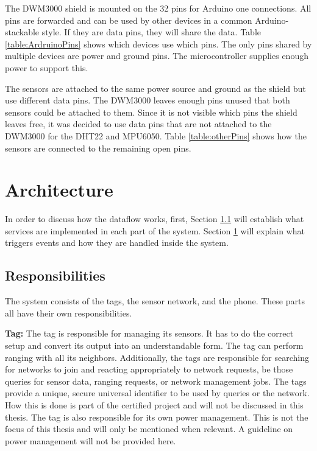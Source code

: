 The DWM3000 shield is mounted on the 32 pins for Arduino one connections. 
All pins are forwarded and can be used by other devices in a common Arduino-stackable style.
If they are data pins, they will share the data.
Table \ref{table:ArdruinoPins} shows which devices use which pins.
The only pins shared by multiple devices are power and ground pins.
The microcontroller supplies enough power to support this.

The sensors are attached to the same power source and ground as the shield but use different data pins.
The DWM3000 leaves enough pins unused that both sensors could be attached to them.
Since it is not visible which pins the shield leaves free, it was decided to use data pins that are not attached to the DWM3000 for the DHT22 and MPU6050.
Table \ref{table:otherPins} shows how the sensors are connected to the remaining open pins.

\section{Architecture}
\label{ss:dataflow}

In order to discuss how the dataflow works, first, Section \ref{ss:responsibility} will establish what services are implemented in each part of the system.
Section \ref{ss:dataflow} will explain what triggers events and how they are handled inside the system.

\subsection{Responsibilities}
\label{ss:responsibility}
The system consists of the tags, the sensor network, and the phone.
These parts all have their own responsibilities.

\textbf{Tag:} 
The tag is responsible for managing its sensors. 
It has to do the correct setup and convert its output into an understandable form.
The tag can perform ranging with all its neighbors.
Additionally, the tags are responsible for searching for networks to join and reacting appropriately to network requests, be those queries for sensor data, ranging requests, or network management jobs. 
The tags provide a unique, secure universal identifier to be used by queries or the network.
How this is done is part of the certified project and will not be discussed in this thesis.
The tag is also responsible for its own power management.
This is not the focus of this thesis and will only be mentioned when relevant.
A guideline on power management will not be provided here.


